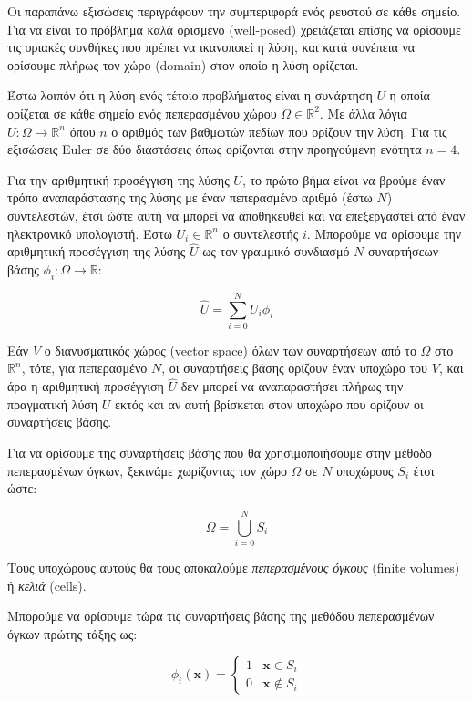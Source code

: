 Οι παραπάνω εξισώσεις περιγράφουν την συμπεριφορά ενός ρευστού σε κάθε σημείο.
Για να είναι το πρόβλημα καλά ορισμένο (well-posed) χρειάζεται επίσης να ορίσουμε τις οριακές συνθήκες που πρέπει να ικανοποιεί η λύση, και κατά συνέπεια να ορίσουμε πλήρως τον χώρο (domain) στον οποίο η λύση ορίζεται.

Έστω λοιπόν ότι η λύση ενός τέτοιο προβλήματος είναι η συνάρτηση $U$ η οποία ορίζεται σε κάθε σημείο ενός πεπερασμένου χώρου $\Omega \in \mathbb{R}^2$.
Με άλλα λόγια $U : \Omega \rightarrow \mathbb{R}^n$ όπου $n$ ο αριθμός των βαθμωτών πεδίων που ορίζουν την λύση.
Για τις εξισώσεις Euler σε δύο διαστάσεις όπως ορίζονται στην προηγούμενη ενότητα $n = 4$.

Για την αριθμητική προσέγγιση της λύσης $U$, το πρώτο βήμα είναι να βρούμε έναν τρόπο αναπαράστασης της λύσης με έναν πεπερασμένο αριθμό (έστω $N$) συντελεστών, έτσι ώστε αυτή να μπορεί να αποθηκευθεί και να επεξεργαστεί από έναν ηλεκτρονικό υπολογιστή.
Έστω $U_i \in \mathbb{R}^n$ ο συντελεστής $i$.
Μπορούμε να ορίσουμε την αριθμητική προσέγγιση της λύσης $\hat{U}$ ως τον γραμμικό συνδιασμό $N$ συναρτήσεων βάσης $\phi_i : \Omega \rightarrow \mathbb{R}$:

\begin{equation}
    \hat{U} = \sum_{i = 0}^{N} U_i \phi_i
\end{equation}

Εάν $V$ ο διανυσματικός χώρος (vector space) όλων των συναρτήσεων από το $\Omega$ στο $\mathbb{R}^n$, τότε, για πεπερασμένο $N$, οι συναρτήσεις βάσης ορίζουν έναν υποχώρο του $V$, και άρα η αριθμητική προσέγγιση $\hat{U}$ δεν μπορεί να αναπαραστήσει πλήρως την πραγματική λύση $U$ εκτός και αν αυτή βρίσκεται στον υποχώρο που ορίζουν οι συναρτήσεις βάσης.

Για να ορίσουμε της συναρτήσεις βάσης που θα χρησιμοποιήσουμε στην μέθοδο πεπερασμένων όγκων, ξεκινάμε χωρίζοντας τον χώρο $\Omega$ σε $N$ υποχώρους $S_i$ έτσι ώστε:

\begin{equation}
    \Omega = \bigcup_{i = 0}^{N} S_i
\end{equation}

Τους υποχώρους αυτούς θα τους αποκαλούμε \emph{πεπερασμένους όγκους} (finite volumes) ή \emph{κελιά} (cells).

Μπορούμε να ορίσουμε τώρα τις συναρτήσεις βάσης της μεθόδου πεπερασμένων όγκων πρώτης τάξης ως:

\begin{equation}
    \phi_i(\mathbf{x}) =
        \begin{cases}
            1 & \mathbf{x} \in S_i \\
            0 & \mathbf{x} \notin S_i
        \end{cases}
\end{equation}

